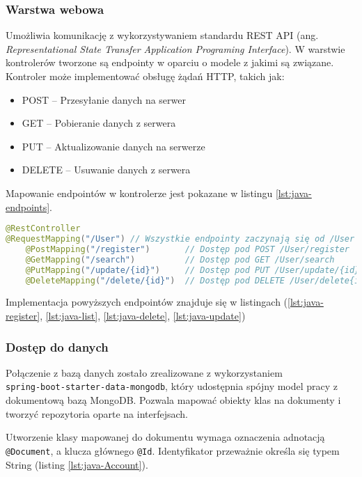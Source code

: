 \subsubsection*{Warstwa webowa}
Umożliwia komunikację z wykorzystywaniem standardu REST API (ang. \textit{Representational State Transfer Application Programing Interface}). W warstwie kontrolerów tworzone są endpointy w oparciu o modele z jakimi są związane. Kontroler może implementować obsługę żądań HTTP, takich jak:
\begin{itemize}
	\item POST -- Przesyłanie danych na serwer
	\item GET -- Pobieranie danych z serwera
	\item PUT -- Aktualizowanie danych na serwerze
	\item DELETE -- Usuwanie danych z serwera
\end{itemize}
Mapowanie endpointów w kontrolerze jest pokazane w listingu \ref{lst:java-endpoints}.
\begin{lstlisting}[language={Java}, caption={Przykładowe Endpointy}, label={lst:java-endpoints}]
@RestController 
@RequestMapping("/User") // Wszystkie endpointy zaczynają się od /User
	@PostMapping("/register")		// Dostęp pod POST /User/register
	@GetMapping("/search")			// Dostęp pod GET /User/search
	@PutMapping("/update/{id}")		// Dostęp pod PUT /User/update/{id}
	@DeleteMapping("/delete/{id}")	// Dostęp pod DELETE /User/delete{id}
\end{lstlisting}

Implementacja powyższych endpointów znajduje się w listingach (\ref{lst:java-register}, \ref{lst:java-list}, \ref{lst:java-delete}, \ref{lst:java-update})
\subsubsection*{Dostęp do danych}
Połączenie z bazą danych zostało zrealizowane z wykorzystaniem \\ \texttt{spring-boot-starter-data-mongodb}, który udostępnia spójny model pracy z dokumentową bazą MongoDB. Pozwala mapować obiekty klas na dokumenty i tworzyć repozytoria oparte na interfejsach.

Utworzenie klasy mapowanej do dokumentu wymaga oznaczenia adnotacją \texttt{@Document}, a klucza głównego \texttt{@Id}. Identyfikator przeważnie określa się typem String (listing \ref{lst:java-Account}). 


